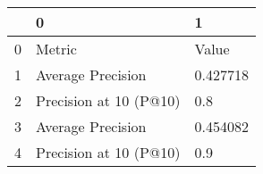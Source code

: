 \begin{tabular}{lll}
\toprule
{} &                       0 &         1 \\
\midrule
0 &                  Metric &     Value \\
1 &       Average Precision &  0.427718 \\
2 &  Precision at 10 (P@10) &       0.8 \\
3 &       Average Precision &  0.454082 \\
4 &  Precision at 10 (P@10) &       0.9 \\
\bottomrule
\end{tabular}
